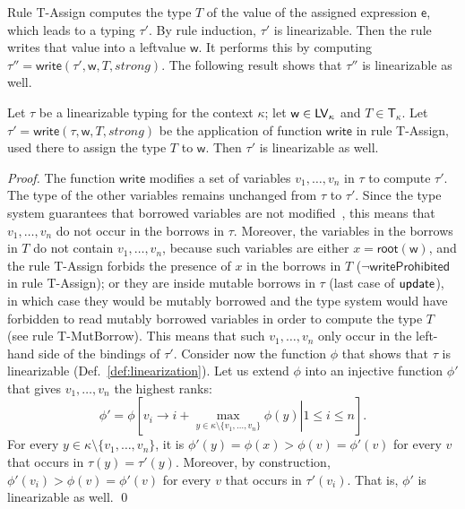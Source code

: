 Rule \textsf{T-Assign} computes the type $T$ of the value of the assigned expression
$\mathsf{e}$, which leads to a typing $\tau'$. By rule induction, $\tau'$ is
linearizable. Then the rule writes that value into a leftvalue $\mathsf{w}$.
It performs this by computing $\tau''=\mathsf{write}(\tau',\mathsf{w},T,\mathit{strong})$.
The following result shows that $\tau''$ is linearizable as well.

\begin{lemma}\label{lem:write_invariant}
  Let $\tau$ be a linearizable typing for the context $\kappa$;
  let $\mathsf{w}\in\mathsf{LV}_\kappa$ and $T\in\mathsf{T}_\kappa$.
  Let $\tau'=\mathsf{write}(\tau,\mathsf{w},T,\mathit{strong})$ be
  the application of function $\mathsf{write}$ in rule \textsf{T-Assign},
  used there to assign the type $T$ to $\mathsf{w}$.
  Then $\tau'$ is linearizable as well.
\end{lemma}
\begin{proof}
  The function $\mathsf{write}$ modifies a set of variables $v_1,\ldots,v_n$ in $\tau$ to compute $\tau'$.
  The type of the other variables remains unchanged from $\tau$ to $\tau'$. Since the
  type system guarantees that borrowed variables are not modified~\cite{Pea21},
  this means that $v_1,\ldots,v_n$ do not occur in the borrows in $\tau$. Moreover,
  the variables in the borrows in $T$ do not contain $v_1,\ldots,v_n$, because
  such variables are either $x=\mathsf{root}(\mathsf{w})$, and the rule \textsf{T-Assign}
  forbids the presence of $x$ in the borrows in $T$ ($\neg\mathsf{writeProhibited}$ in rule
  \textsf{T-Assign}); or they are inside mutable borrows in $\tau$ (last case of
  $\mathsf{update}$), in which case they would be mutably borrowed and the type system
  would have forbidden to read mutably borrowed variables in order to compute
  the type $T$ (see rule \textsf{T-MutBorrow}).
  This means that such $v_1,\ldots,v_n$ only occur in the left-hand side of the bindings of $\tau'$.
  Consider now the function $\phi$ that shows that $\tau$ is linearizable
  (Def.~\ref{def:linearization}).
  Let us extend $\phi$ into an injective function $\phi'$
  that gives $v_1,\ldots,v_n$ the highest ranks:
  \[
  \phi'=\phi\left[\left.v_i\to i+\max\limits_{y\in\kappa\setminus\{v_1,\ldots,v_n\}}\phi(y)\right|1\le i\le n\right].
  \]
  For every $y\in\kappa\setminus\{v_1,\ldots,v_n\}$, it is
  $\phi'(y)=\phi(x)>\phi(v)=\phi'(v)$ for every $v$ that occurs in $\tau(y)=\tau'(y)$.
  Moreover, by construction, $\phi'(v_i)>\phi(v)=\phi'(v)$ for every $v$ that occurs in $\tau'(v_i)$.
  That is, $\phi'$ is linearizable as well.
  \qed
\end{proof}
